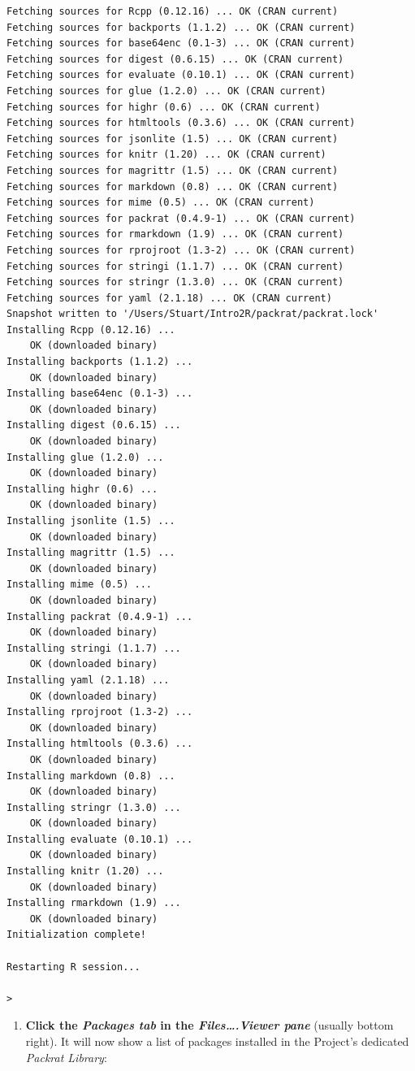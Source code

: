 \documentclass[]{book}
\providecommand{\tightlist}{%
  \setlength{\itemsep}{0pt}\setlength{\parskip}{0pt}}
\theoremstyle{definition}
\theoremstyle{definition}
\theoremstyle{definition}
\theoremstyle{remark}
\begin{document}
\begin{verbatim}
Fetching sources for Rcpp (0.12.16) ... OK (CRAN current)
Fetching sources for backports (1.1.2) ... OK (CRAN current)
Fetching sources for base64enc (0.1-3) ... OK (CRAN current)
Fetching sources for digest (0.6.15) ... OK (CRAN current)
Fetching sources for evaluate (0.10.1) ... OK (CRAN current)
Fetching sources for glue (1.2.0) ... OK (CRAN current)
Fetching sources for highr (0.6) ... OK (CRAN current)
Fetching sources for htmltools (0.3.6) ... OK (CRAN current)
Fetching sources for jsonlite (1.5) ... OK (CRAN current)
Fetching sources for knitr (1.20) ... OK (CRAN current)
Fetching sources for magrittr (1.5) ... OK (CRAN current)
Fetching sources for markdown (0.8) ... OK (CRAN current)
Fetching sources for mime (0.5) ... OK (CRAN current)
Fetching sources for packrat (0.4.9-1) ... OK (CRAN current)
Fetching sources for rmarkdown (1.9) ... OK (CRAN current)
Fetching sources for rprojroot (1.3-2) ... OK (CRAN current)
Fetching sources for stringi (1.1.7) ... OK (CRAN current)
Fetching sources for stringr (1.3.0) ... OK (CRAN current)
Fetching sources for yaml (2.1.18) ... OK (CRAN current)
Snapshot written to '/Users/Stuart/Intro2R/packrat/packrat.lock'
Installing Rcpp (0.12.16) ... 
    OK (downloaded binary)
Installing backports (1.1.2) ... 
    OK (downloaded binary)
Installing base64enc (0.1-3) ... 
    OK (downloaded binary)
Installing digest (0.6.15) ... 
    OK (downloaded binary)
Installing glue (1.2.0) ... 
    OK (downloaded binary)
Installing highr (0.6) ... 
    OK (downloaded binary)
Installing jsonlite (1.5) ... 
    OK (downloaded binary)
Installing magrittr (1.5) ... 
    OK (downloaded binary)
Installing mime (0.5) ... 
    OK (downloaded binary)
Installing packrat (0.4.9-1) ... 
    OK (downloaded binary)
Installing stringi (1.1.7) ... 
    OK (downloaded binary)
Installing yaml (2.1.18) ... 
    OK (downloaded binary)
Installing rprojroot (1.3-2) ... 
    OK (downloaded binary)
Installing htmltools (0.3.6) ... 
    OK (downloaded binary)
Installing markdown (0.8) ... 
    OK (downloaded binary)
Installing stringr (1.3.0) ... 
    OK (downloaded binary)
Installing evaluate (0.10.1) ... 
    OK (downloaded binary)
Installing knitr (1.20) ... 
    OK (downloaded binary)
Installing rmarkdown (1.9) ... 
    OK (downloaded binary)
Initialization complete!

Restarting R session...

> 
\end{verbatim}

\begin{enumerate}
\def\labelenumi{\arabic{enumi}.}
\setcounter{enumi}{7}
\tightlist
\item
  \textbf{Click the \emph{Packages tab} in the
  \emph{Files\ldots{}.Viewer pane}} (usually bottom right). It will now
  show a list of packages installed in the Project's dedicated
  \emph{Packrat Library}:
\end{enumerate}
\end{document}
